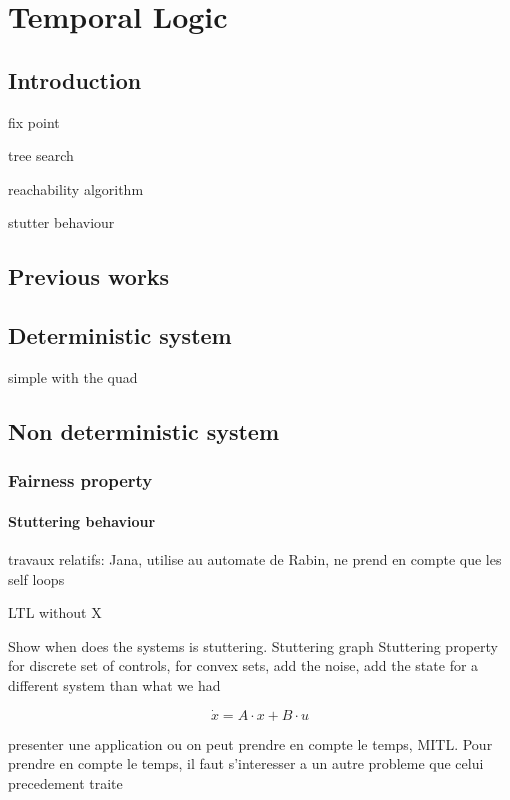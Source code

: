 \documentclass{report}
\begin{document}
\chapter{Temporal Logic}

\section*{Introduction}

fix point

tree search

reachability algorithm

stutter behaviour

\section*{Previous works}

\section*{Deterministic system}

simple with the quad

\section*{Non deterministic system}

\subsection*{Fairness property}

\subsubsection*{Stuttering behaviour}

travaux relatifs: 
Jana, utilise au automate de Rabin, ne prend en compte que les self loops

LTL without X

Show when does the systems is stuttering.
Stuttering graph
Stuttering property for discrete set of controls, for convex sets, add the noise, add the state for a different system than what we had

$$\dot{x} = A \cdot x + B \cdot u$$

presenter une application ou on peut prendre en compte le temps, MITL.
Pour prendre en compte le temps, il faut s'interesser a un autre probleme que celui precedement traite
\end{document}
